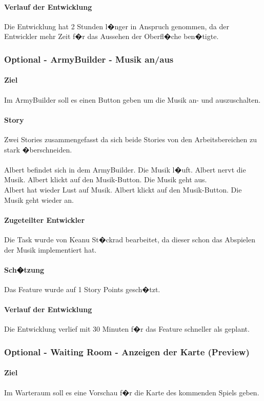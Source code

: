 \documentclass[12pt, titlepage]{scrartcl}
\begin{document}
		\paragraph{Verlauf der Entwicklung} 
		Die Entwicklung hat 2 Stunden l�nger in Anspruch genommen, da der Entwickler mehr Zeit f�r das Aussehen der Oberfl�che ben�tigte.
		
		\subsubsection{Optional - ArmyBuilder - Musik an/aus}
		\paragraph{Ziel} Im ArmyBuilder soll es einen Button geben um die Musik an- und auszuschalten. 
		\paragraph{Story} Zwei Stories zusammengefasst da sich beide Stories von den Arbeitsbereichen zu stark �berschneiden. \\ \ \\ Albert befindet sich in dem ArmyBuilder. Die Musik l�uft. Albert nervt die Musik. Albert klickt auf den Musik-Button. Die Musik geht aus. \\ Albert hat wieder Lust auf Musik. Albert klickt auf den Musik-Button. Die Musik geht wieder an.
		\paragraph{Zugeteilter Entwickler} Die Task wurde von Keanu St�ckrad bearbeitet, da dieser schon das Abspielen der Musik implementiert hat.
		\paragraph{Sch�tzung}
		Das Feature wurde auf 1 Story Points gesch�tzt.
		\paragraph{Verlauf der Entwicklung} 
		Die Entwicklung verlief mit 30 Minuten f�r das Feature schneller als geplant.
		
		\subsubsection{Optional - Waiting Room - Anzeigen der Karte (Preview)}
		\paragraph{Ziel} Im Warteraum soll es eine Vorschau f�r die Karte des kommenden Spiels geben.
\end{document}
